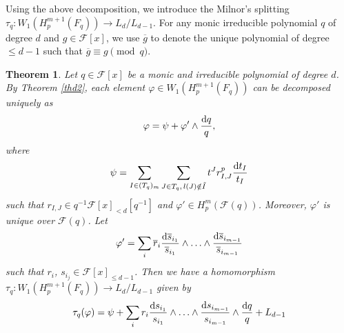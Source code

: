 \documentclass[times,10pt]{amsart}
\newcommand{\dd}{{\rm d}}
\newcommand{\F}{\ensuremath{\mathcal{F}}}
\renewcommand{\phi}{\varphi}
\newtheorem{thm}{Theorem}[section]
\begin{document}
      Using the above decomposition, we introduce the Milnor's splitting $\tau_q: W_1(H_p^{m+1}(F_q))\xrightarrow{} L_d/ L_{d-1}$. For any monic irreducible polynomial $q$ of degree $d$ and $g\in \F[x]$, we use $\overline{g} $ to denote the unique polynomial of degree $\leq d-1$ such that $ \overline{g}\equiv g\pmod{q}$.

      \begin{thm}\label{thmil}
          Let $q\in \F[x]$ be a monic and irreducible polynomial of degree $d$. By Theorem \ref{thd2}, each element $\phi\in W_1(H_p^{m+1}(F_q))$ can be decomposed uniquely as $$ \phi=\psi+ \phi'\wedge\frac{\dd q}{q},$$ where  $$  \psi= \sum_{I\in (T_q)_m}\sum_{J\in T_q,\, l(J)\notin \tilde{I}} t^Jr^p_{I,J} \frac{\dd t_I}{t_I}$$ such that $ r_{I,J}\in q^{-1} \F[x]_{< d}[q^{-1}]$ and  $\phi'\in H_p^m(\F(q))$. Moreover, $\phi'$ is unique over $ \F(q)$.  Let $$  \phi'= \sum_{i}\overline{r}_i\frac{\dd \overline{s}_{i_1}}{\overline{s}_{i_1}}\wedge\ldots\wedge\frac{\dd \overline{s}_{i_{m-1}}}{\overline{s}_{i_{m-1}}} $$ such that $ r_i$,  $s_{i_j}\in \F[x]_{\leq d-1}$. Then we have a homomorphism $\tau_q: W_1( H_p^{m+1}(F_q))\xrightarrow{}L_d/L_{d-1}$ given by $$ \tau_q ( \phi)= \psi+ \sum_{i}  r_i \frac{\dd s_{i_1}}{s_{i_1}}\wedge \ldots\wedge \frac{\dd s_{i_{m-1}}}{s_{i_{m-1}}}\wedge \frac{\dd q}{q}+L_{d-1} $$
      \end{thm}
\end{document}

